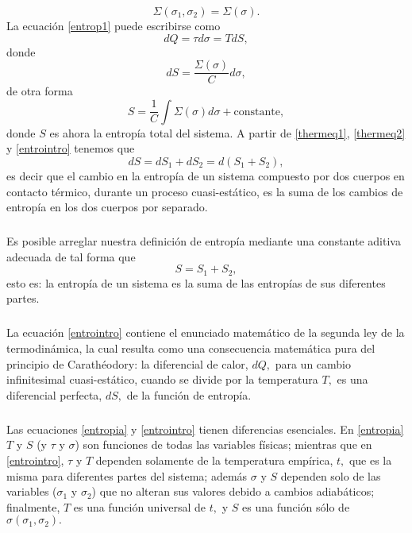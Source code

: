 \documentclass{article}
\theoremstyle{definition} \newtheorem{defi}{Definici\'on}
\theoremstyle{definition} \newtheorem{teo}{Teorema}
\theoremstyle{definition} \newtheorem{cor}{Corolario}
\begin{document}
\begin{equation}
 \Sigma(\sigma_1,\sigma_2)=\Sigma(\sigma).
\end{equation}
La ecuaci\'on \eqref{entrop1} puede escribirse como
\begin{equation}
dQ=\tau d\sigma=TdS,\label{entrointro}
\end{equation}
donde
\begin{equation}
dS=\frac{\Sigma(\sigma)}{C}d\sigma,
\end{equation}
de otra forma
\begin{equation}\label{entroint}
S=\frac{1}{C}\int\Sigma(\sigma)d\sigma+\text{constante},
\end{equation}
donde $S$ es ahora la entrop\'ia total del sistema. A partir de \eqref{thermeq1}, \eqref{thermeq2} y \eqref{entrointro} tenemos que
\begin{equation}
dS=dS_1+dS_2=d(S_1+S_2),
\end{equation}
es decir que el cambio en la entrop\'ia de un sistema compuesto por dos cuerpos en contacto t\'ermico, durante un proceso cuasi-est\'atico, es la suma de los cambios de entrop\'ia en los dos cuerpos por separado.
\subparagraph{}
Es posible arreglar nuestra definici\'on de entrop\'ia mediante una constante aditiva adecuada de tal forma que
\begin{equation}
S=S_1+S_2,
\end{equation}
esto es: la entrop\'ia de un sistema es la suma de las entrop\'ias de sus diferentes partes.
\subparagraph{}
La ecuaci\'on \eqref{entrointro} contiene el enunciado matem\'atico de la segunda ley de la termodin\'amica, la cual resulta como una consecuencia matem\'atica pura del principio de Carath\'eodory: la diferencial de calor, $dQ,$ para un cambio infinitesimal cuasi-est\'atico, cuando se divide por la temperatura $T,$ es una diferencial perfecta, $dS,$ de la funci\'on de entrop\'ia.
\subparagraph{}
Las ecuaciones \eqref{entropia} y \eqref{entrointro} tienen diferencias esenciales. En \eqref{entropia} $T$ y $S$ (y $\tau$ y $\sigma$) son funciones de todas las variables f\'isicas; mientras que en \eqref{entrointro}, $\tau$ y $T$ dependen solamente de la temperatura emp\'irica, $t,$ que es la misma para diferentes partes del sistema; adem\'as $\sigma$ y $S$ dependen solo de las variables ($\sigma_1$ y $\sigma_2$) que no alteran sus valores debido a cambios adiab\'aticos; finalmente, $T$ es una funci\'on universal de $t,$ y $S$ es una funci\'on s\'olo de $\sigma(\sigma_1,\sigma_2).$
\subparagraph{}
\end{document}
